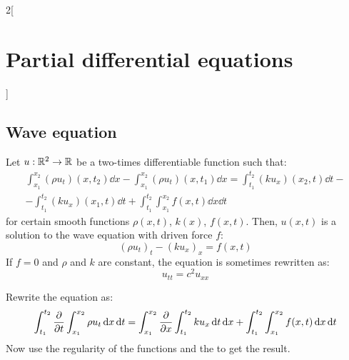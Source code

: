 \documentclass[../../../main_math.tex]{subfiles}
\begin{document}
\begin{multicols}{2}[\section{Partial differential equations}]
  \subsection{Wave equation}
  \begin{proposition}
    Let $u:\mathbb{R}^2\rightarrow\mathbb{R}$ be a two-times differentiable function such that:
    \begin{equation*}
      \begin{split}
        \int_{x_1}^{x_2}(\rho u_t)(x,t_2)\dd{x}-\int_{x_1}^{x_2}(\rho u_t)(x,t_1)\dd{x}=\int_{t_1}^{t_2}(ku_x)(x_2,t)\dd{t}-\\-\int_{t_1}^{t_2}(ku_x)(x_1,t)\dd{t}+\int_{t_1}^{t_2}\int_{x_1}^{x_2}f(x,t)\dd{x}\dd{t}
      \end{split}
    \end{equation*}
    for certain smooth functions $\rho(x,t)$, $k(x)$, $f(x,t)$. Then, $u(x,t)$ is a solution to the wave equation with driven force $f$:
    $${(\rho u_{t})}_t-{(ku_x)}_x=f(x,t)$$
    If $f=0$ and $\rho$ and $k$ are constant, the equation is sometimes rewritten as:
    \begin{equation}\label{PDE:waveeq}
      u_{tt}=c^2 u_{xx}
    \end{equation}
  \end{proposition}
  \begin{sproof}
    Rewrite the equation as:
    $$\int_{t_1}^{t_2}\pdv{}{t}\int_{x_1}^{x_2}\rho u_t\dd{x}\dd{t}=\int_{x_1}^{x_2}\pdv{}{x}\int_{t_1}^{t_2}ku_x\dd{t}\dd{x}+\int_{t_1}^{t_2}\int_{x_1}^{x_2}f(x,t)\dd{x}\dd{t}$$
    Now use the regularity of the functions and the  to get the result.
  \end{sproof}

\end{multicols}
\end{document}
